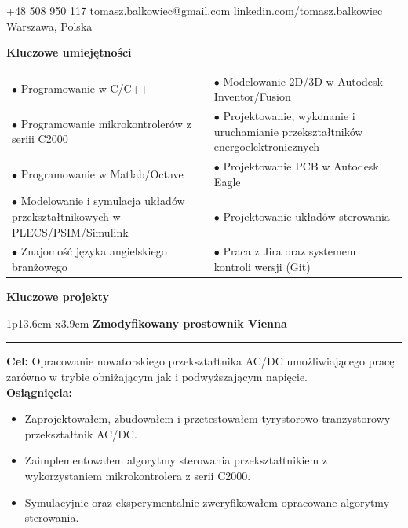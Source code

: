 \documentclass[10pt,A4]{article}
\newcommand{\cvsection}[1]
{
	\begin{center}
		\large\textcolor{sectcol}{\textbf{#1}}
	\end{center}
}
\newcommand{\metasection}[2]
{
\footnotesize{#2} \hspace*{\fill} \footnotesize{#1}\\[1pt]
}
\newcommand{\cveventModified}[1]
{

\begin{tabular*}{1\textwidth}{p{13.6cm}  x{3.9cm}}
	\textbf{#1}
\end{tabular*}

\vspace{-8pt}
\textcolor{black}{\hrule}
	
\vspace{3pt}
}
\begin{document}
\footnotesize{ +48 508 950 117} \hspace{1cm} \footnotesize{ tomasz.balkowiec@gmail.com} \hspace{1cm} \footnotesize{ \href{https://www.linkedin.com/in/tomasz-balkowiec}{linkedin.com/tomasz.balkowiec}}\\[1pt]
\footnotesize{ Warszawa, Polska} 


\normalsize

\vspace{-6pt}

\cvsection{Kluczowe umiejętności}
\begin{tabular}{m{}m{}}
	$\bullet$ Programowanie w C/C++
	&
	$\bullet$ Modelowanie 2D/3D w Autodesk Inventor/Fusion
	\\
	$\bullet$ Programowanie mikrokontrolerów z seriii C2000
	&
	$\bullet$ Projektowanie, wykonanie i uruchamianie \newline przekształtników energoelektronicznych
	\\
	$\bullet$ Programowanie w Matlab/Octave
	&
	$\bullet$ Projektowanie PCB w Autodesk Eagle
	\\
	$\bullet$ Modelowanie i symulacja układów przekształtnikowych w PLECS/PSIM/Simulink
	&
	$\bullet$ Projektowanie układów sterowania
	\\
	$\bullet$ Znajomość języka angielskiego branżowego
	&
	$\bullet$ Praca z Jira oraz systemem kontroli wersji (Git)
\end{tabular}

\cvsection{Kluczowe projekty}

\cveventModified{Zmodyfikowany prostownik Vienna}
\textbf{Cel:} Opracowanie nowatorskiego przekształtnika AC/DC umożliwiającego pracę zarówno w trybie obniżającym jak i podwyższającym napięcie. \\
\textbf{Osiągnięcia:}
\begin{itemize}[label=$\bullet$, nolistsep, leftmargin=*]
	\item Zaprojektowałem, zbudowałem i przetestowałem tyrystorowo-tranzystorowy przekształtnik AC/DC.
	\item Zaimplementowałem algorytmy sterowania przekształtnikiem z wykorzystaniem mikrokontrolera z serii C2000.
	\item Symulacyjnie oraz eksperymentalnie zweryfikowałem opracowane algorytmy sterowania.
\end{itemize}
\end{document}

